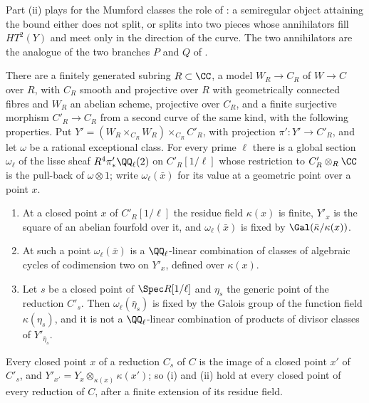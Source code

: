 Part (ii) plays for the Mumford classes the role of : a
semiregular object attaining the bound either does not split, or splits into
two pieces whose annihilators fill $HT^{2}(Y)$ and meet only in the direction
of the curve. The two annihilators are the analogue of the two branches $P$
and $Q$ of \cite[Remark~2.10]{paperII}.

\begin{proposition}
\label{prop:modp}
There are a finitely generated subring $R\subset\CC$, a model $W_{R}\to
C_{R}$ of $W\to C$ over $R$, with $C_{R}$ smooth and projective over $R$ with
geometrically connected fibres and $W_{R}$ an abelian scheme, projective over
$C_{R}$, and a finite surjective morphism $C'_{R}\to C_{R}$ from a second curve of the same
kind, with the following properties. Put $Y'=(W_{R}\times_{C_{R}}W_{R})
\times_{C_{R}}C'_{R}$, with projection $\pi'\colon Y'\to C'_{R}$, and let
$\omega$ be a rational exceptional class. For every prime $\ell$ there is a
global section $\omega_{\ell}$ of the lisse sheaf
$R^{4}\pi'_{*}\QQ_{\ell}(2)$ on $C'_{R}[1/\ell]$ whose restriction to
$C'_{R}\otimes_{R}\CC$ is the pull-back of $\omega\otimes1$; write
$\omega_{\ell}(\bar{x})$ for its value at a geometric point over a point $x$.
\begin{enumerate}[label=\textup{(\roman*)},leftmargin=2.6em,itemsep=2pt]
\item At a closed point $x$ of $C'_{R}[1/\ell]$ the residue field
  $\kappa(x)$ is finite, $Y'_{x}$ is the square of an abelian fourfold over
  it, and $\omega_{\ell}(\bar{x})$ is fixed by $\Gal(\bar{\kappa}/\kappa(x))$.
\item At such a point $\omega_{\ell}(\bar{x})$ is a $\QQ_{\ell}$-linear
  combination of classes of algebraic cycles of codimension two on $Y'_{x}$,
  defined over $\kappa(x)$.
\item Let $s$ be a closed point of $\Spec R[1/\ell]$ and $\eta_{s}$ the generic
  point of the reduction $C'_{s}$. Then $\omega_{\ell}(\bar\eta_{s})$ is fixed
  by the Galois group of the function field $\kappa(\eta_{s})$, and it is not
  a $\QQ_{\ell}$-linear combination of products of divisor classes of
  $Y'_{\bar\eta_{s}}$.
\end{enumerate}
Every closed point $x$ of a reduction $C_{s}$ of $C$ is the image of a closed
point $x'$ of $C'_{s}$, and $Y'_{x'}=Y_{x}\otimes_{\kappa(x)}\kappa(x')$; so
(i) and (ii) hold at every closed point of every reduction of $C$, after a
finite extension of its residue field.
\end{proposition}

